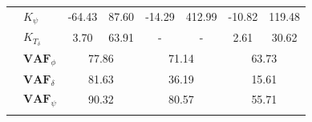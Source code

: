 \begin{table}[]
\begin{tabular}{llcccccc}
                                                   & $K_\psi $                                              & -64.43                                      & 87.60                                                & -14.29                                      & 412.99                                               & -10.82                                      & 119.48                                               \\
                                                   & $K_{T_\delta}$                                         & 3.70                                        & 63.91                                                & -                                           & -                                                    & 2.61                                        & 30.62                                                \\ \cline{2-8} 
                                                   & $\mathbf{VAF}_\phi$                                    & \multicolumn{2}{c}{77.86}                                                                          & \multicolumn{2}{c}{71.14}                                                                          & \multicolumn{2}{c}{63.73}                                                                          \\
                                                   & $\mathbf{VAF}_\delta$                                  & \multicolumn{2}{c}{81.63}                                                                          & \multicolumn{2}{c}{36.19}                                                                          & \multicolumn{2}{c}{15.61}                                                                          \\
                                                   & $\mathbf{VAF}_\psi$                                    & \multicolumn{2}{c}{90.32}                                                                          & \multicolumn{2}{c}{80.57}                                                                          & \multicolumn{2}{c}{55.71}                                                                          \\
                                                   &                                                        & \multicolumn{1}{l}{}                        & \multicolumn{1}{l}{}                                 & \multicolumn{1}{l}{}                        & \multicolumn{1}{l}{}                                 & \multicolumn{1}{l}{}                        & \multicolumn{1}{l}{}                                 \\ \hline

\end{tabular}
\end{table}
